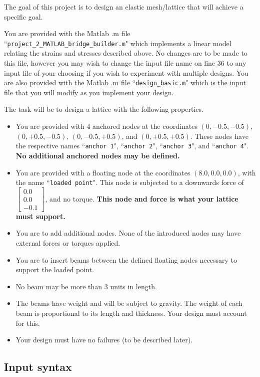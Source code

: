 \documentclass{article}
\begin{document}
The goal of this project is to design an elastic mesh/lattice that will achieve a specific goal.

You are provided with the Matlab .m file ``\texttt{project\_2\_MATLAB\_bridge\_builder.m}" which implements a linear model relating the strains and stresses described above. No changes are to be made to this file, however you may wish to change the input file name on line 36 to any input file of your choosing if you wish to experiment with multiple designs. You are also provided with the Matlab .m file ``\texttt{design\_basic.m}" which is the input file that you will modify as you implement your design. 

The task will be to design a lattice with the following properties. 
\begin{itemize}
\item You are provided with \(4\) anchored nodes at the coordinates \((0, -0.5, -0.5)\), \((0, +0.5, -0.5)\), \((0, -0.5, +0.5)\), and \((0, +0.5, +0.5)\). These nodes have the respective names ``\texttt{anchor 1}", ``\texttt{anchor 2}", ``\texttt{anchor 3}", and ``\texttt{anchor 4}". {\bf No additional anchored nodes may be defined.}
\item You are provided with a floating node at the coordinates \((8.0, 0.0, 0.0)\), with the name ``\texttt{loaded point}". This node is subjected to a downwards force of \(\begin{bmatrix} 0.0 \\ 0.0 \\ -0.1 \end{bmatrix}\), and no torque. {\bf This node and force is what your lattice must support.}
\item You are to add additional nodes. None of the introduced nodes may have external forces or torques applied. 
\item You are to insert beams between the defined floating nodes necessary to support the loaded point. 
\item No beam may be more than \(3\) units in length. 
\item The beams have weight and will be subject to gravity. The weight of each beam is proportional to its length and thickness. Your design must account for this. 
\item Your design must have no failures (to be described later).
\end{itemize}



\subsection{Input syntax}
\end{document}
